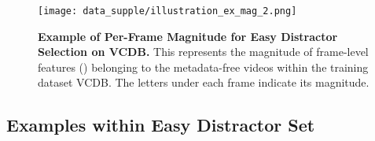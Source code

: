 \documentclass[10pt,twocolumn,letterpaper]{article}
\begin{document}
        

    \begin{figure*}[!ht]    
        \centering
        \texttt{[image: data\_supple/illustration\_ex\_mag\_2.png]} \vspace{-0mm}
        \caption{\textbf{Example of Per-Frame Magnitude for Easy Distractor Selection on VCDB.} This represents the magnitude of frame-level features () belonging to the metadata-free videos within the training dataset VCDB. The letters under each frame indicate its magnitude.\vspace{-0mm}} \label{fig:ex_mag}
    \end{figure*}
    
    
    \subsection{Examples within Easy Distractor Set} \label{ddm_exam}
\end{document}
